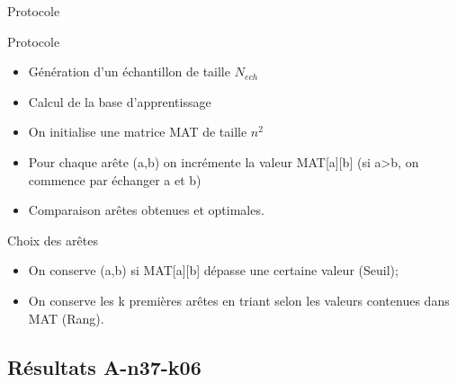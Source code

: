 \documentclass{beamer}
\begin{document}
\begin{frame}{Protocole}

\begin{exampleblock}{Protocole}
\begin{itemize}
\item Génération d'un échantillon de taille $N_{ech}$
\item Calcul de la base d'apprentissage
\item On initialise une matrice MAT de taille $n^2$
\item Pour chaque arête (a,b) on incrémente la valeur MAT[a][b] (si a>b, on commence par échanger a et b)
\item Comparaison arêtes obtenues et optimales.
\end{itemize}
\end{exampleblock}

\begin{block}{Choix des arêtes}
\begin{itemize}
\item On conserve (a,b) si MAT[a][b] dépasse une certaine valeur (Seuil);
\item On conserve les k premières arêtes en triant selon les valeurs contenues dans MAT (Rang).
\end{itemize}
\end{block}

\end{frame}

\subsection{Résultats A-n37-k06}
\end{document}
